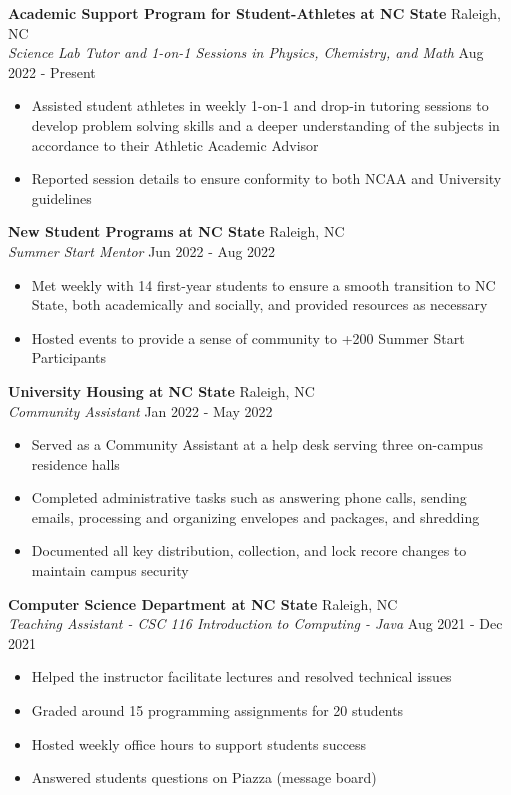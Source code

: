 \documentclass[a4paper]{article}
\begin{document}
\textbf{Academic Support Program for Student-Athletes at NC State} \hfill Raleigh, NC\\
\textit{Science Lab Tutor and 1-on-1 Sessions in Physics, Chemistry, and Math} \hfill Aug 2022 - Present\\
\vspace{-1mm}
\begin{itemize} \itemsep 1pt
	\item Assisted student athletes in weekly 1-on-1 and drop-in tutoring sessions to develop problem solving skills and a deeper understanding of the subjects in accordance to their Athletic Academic Advisor
	\item Reported session details to ensure conformity to both NCAA and University guidelines
\end{itemize}
\textbf{New Student Programs at NC State} \hfill Raleigh, NC\\
\textit{Summer Start Mentor} \hfill Jun 2022 - Aug 2022\\
\vspace{-1mm}
\begin{itemize} \itemsep 1pt
	\item Met weekly with 14 first-year students to ensure a smooth transition to NC State, both academically and socially, and provided resources as necessary
	\item Hosted events to provide a sense of community to +200 Summer Start Participants
\end{itemize}
\textbf{University Housing at NC State} \hfill Raleigh, NC\\
\textit{Community Assistant} \hfill Jan 2022 - May 2022\\
\vspace{-1mm}
\begin{itemize} \itemsep 1pt
	\item Served as a Community Assistant at a help desk serving three on-campus residence halls
	\item Completed administrative tasks such as answering phone calls, sending emails, processing and organizing envelopes and packages, and shredding
	\item Documented all key distribution, collection, and lock recore changes to maintain campus security
\end{itemize}
\textbf{Computer Science Department at NC State} \hfill Raleigh, NC\\
\textit{Teaching Assistant - CSC 116 Introduction to Computing - Java} \hfill Aug 2021 - Dec 2021\\
\vspace{-1mm}
\begin{itemize} \itemsep 1pt
	\item Helped the instructor facilitate lectures and resolved technical issues
	\item Graded around 15 programming assignments for 20 students
	\item Hosted weekly office hours to support students\textquotesingle{} success
	\item Answered students\textquotesingle{} questions on Piazza (message board)
\end{itemize}






\ 
\end{document}
